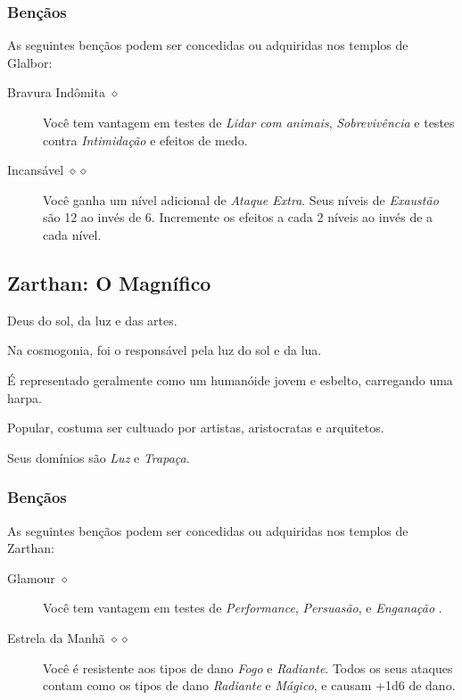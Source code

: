 \documentclass[letterpaper,twocolumn,openany]{dndbook}
\begin{document}
	\subsubsection{Bençãos}
	As seguintes bençãos podem ser concedidas ou adquiridas nos templos de Glalbor:
	\begin{description}
		\item[Bravura Indômita $\diamond$]
		Você tem vantagem em testes de \textit{Lidar com animais}, \textit{Sobrevivência} e testes contra \textit{Intimidação} e efeitos de medo.
		\item[Incansável $\diamond\diamond$]
		Você ganha um nível adicional de \textit{Ataque Extra}. Seus níveis de \textit{Exaustão} são 12 ao invés de 6. Incremente os efeitos a cada 2 níveis ao invés de a cada nível.
	\end{description}
	
	\subsection{Zarthan: O Magnífico}
	Deus do sol, da luz e das artes.
	\par Na cosmogonia, foi o responsável pela luz do sol e da lua.
	\par É representado geralmente como um humanóide jovem e esbelto, carregando uma harpa.
	\par Popular, costuma ser cultuado por artistas, aristocratas e arquitetos.
	\par Seus domínios são \textit{Luz} e \textit{Trapaça}.
	\subsubsection{Bençãos}
	As seguintes bençãos podem ser concedidas ou adquiridas nos templos de Zarthan:
	\begin{description}
		\item[Glamour $\diamond$]
		Você tem vantagem em testes de \textit{Performance}, \textit{Persuasão}, e \textit{Enganação} .
		\item[Estrela da Manhã $\diamond\diamond$]
		Você é resistente aos tipos de dano \textit{Fogo} e \textit{Radiante}. Todos os seus ataques contam como os tipos de dano \textit{Radiante} e \textit{Mágico}, e causam +1d6 de dano.
	\end{description}
	
\end{document}
